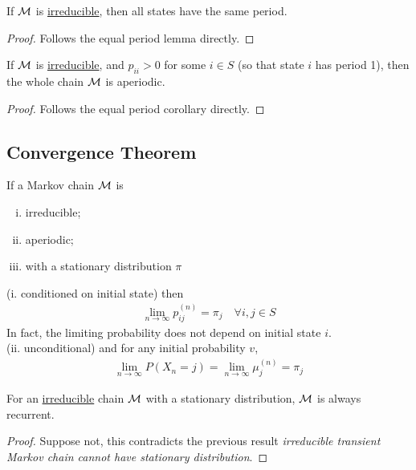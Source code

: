 \documentclass{article}
\newcommand{\upn}[0]{^{(n)}}
\begin{document}
	\begin{corollary}
		If $\mathcal{{M}}$ is \ul{irreducible}, then all states have the same period.
	\end{corollary}
	\begin{proof}
		Follows the equal period lemma directly.
	\end{proof}
	
	\begin{corollary}
		If $\mathcal{{M}}$ is \ul{irreducible}, and $p_{ii} > 0$ for some $i \in S$ (so that state $i$ has period 1), then the whole chain $\mathcal{{M}}$ is aperiodic.
	\end{corollary}

	\begin{proof}
		Follows the equal period corollary directly.
	\end{proof}
	
	\subsection{Convergence Theorem}
	
	\begin{theorem}
		If a Markov chain $\mathcal{{M}}$ is 
		\begin{enumerate}[(i)]
			\item irreducible;
			\item aperiodic;
			\item with a stationary distribution $\pi$
		\end{enumerate}
		(i. conditioned on initial state) then
		\begin{align}
			\lim_{n \to \infty} p_{ij}\upn = \pi_j\quad\forall i, j \in S
		\end{align}
		In fact, the limiting probability does not depend on initial state $i$. \\
		(ii. unconditional) and for any initial probability $v$,
		\begin{align}
			\lim_{n \to \infty} P(X_n = j) 
			= \lim_{n \to \infty} \mu_j\upn
			= \pi_j
		\end{align}
	\end{theorem}
	
	\begin{theorem}
		For an \ul{irreducible} chain $\mathcal{{M}}$ with a stationary distribution, $\mathcal{{M}}$ is always recurrent.
	\end{theorem}
	
	\begin{proof}
		Suppose not, this contradicts the previous result \emph{irreducible transient Markov chain cannot have stationary distribution}.
	\end{proof}
	
\end{document}
